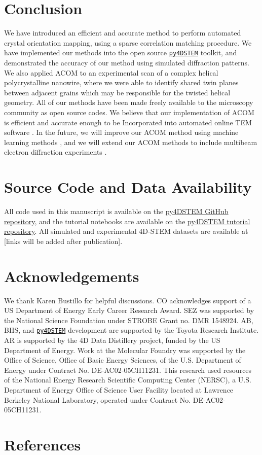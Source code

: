 \documentclass[%
 superscriptaddress,
 aip,
 amsmath,amssymb,
reprint,%
 author-year,%
longbibliography
]{revtex4-2}
\newcommand{\pyFDSTEM}{\href{https://github.com/py4dstem/py4DSTEM}{\texttt{py4DSTEM}}}
\begin{document}
\section*{Conclusion}

We have introduced an efficient and accurate method to perform automated crystal orientation mapping, using a sparse correlation matching procedure. We have implemented our methods into the open source \pyFDSTEM{} toolkit, and demonstrated the accuracy of our method using simulated diffraction patterns. We also applied ACOM to an experimental scan of a complex helical polycrystalline nanowire, where we were able to identify shared twin planes between adjacent grains which may be responsible for the twisted helical geometry. All of our methods have been made freely available to the microscopy community as open source codes. We believe that our implementation of ACOM is efficient and accurate enough to be Incorporated into automated online TEM software \citep{spurgeon2021towards}. In the future, we will improve our ACOM method using machine learning methods \cite{munshi2021ml}, and we will extend our ACOM methods to include multibeam electron diffraction experiments \citep{hong2021multibeam}.


\section*{Source Code and Data Availability}

All code used in this manuscript is available on the \href{https://github.com/py4dstem/py4DSTEM/tree/acom}{py4DSTEM GitHub repository}, and the tutorial notebooks are available on the \href{https://github.com/py4dstem/py4DSTEM_tutorials/tree/main/notebooks/acom}{py4DSTEM tutorial repository}. All simulated and experimental 4D-STEM datasets are available at [links will be added after publication].


\section*{Acknowledgements}

We thank Karen Bustillo for helpful discussions. CO acknowledges support of a US Department of Energy Early Career Research Award. SEZ was supported by the National Science Foundation under STROBE Grant no. DMR 1548924. AB, BHS, and \pyFDSTEM{} development are supported by the Toyota Research Institute. AR is supported by the 4D Data Distillery project, funded by the US Department of Energy. Work at the Molecular Foundry was supported by the Office of Science, Office of Basic Energy Sciences, of the U.S. Department of Energy under Contract No. DE-AC02-05CH11231. This research used resources of the National Energy Research Scientific Computing Center (NERSC), a U.S. Department of Energy Office of Science User Facility located at Lawrence Berkeley National Laboratory, operated under Contract No. DE-AC02-05CH11231.




\section*{References}
% 
    
\end{document}
